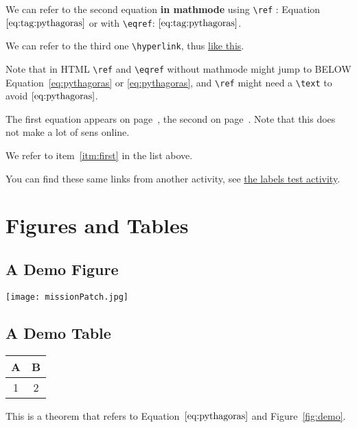 \documentclass{ximera}
\begin{document}
We can refer to the second equation \textbf{in mathmode} using \verb|\ref| : Equation~$\text{\ref{eq:tag:pythagoras}}$ or with \verb|\eqref|: $\eqref{eq:tag:pythagoras}$.

We can refer to the third one  \verb|\hyperlink|, thus \hyperlink{ht:pythagoras}{like this}.

Note that in HTML \verb|\ref| and \verb|\eqref| without mathmode might jump to BELOW Equation~\ref{eq:pythagoras} or \eqref{eq:pythagoras}, and
\verb|\ref| might need a \verb|\text| to avoid $\ref{eq:pythagoras}$.

The first equation appears on page~\pageref{eq:pythagoras}, the second on page~\pageref{eq:tag:pythagoras}. 
Note that this does not make a lot of sens online.

We refer to item~\ref{itm:first} in the list above.

You can find these same links from another activity, see \hyperlink{xim:labelsFromOtherActivity}{the labels test activity}.

\section{Figures and Tables}

\subsection{A Demo Figure}
\label{sec:fig}

\begin{image}[0.3\textwidth]
  \centering
  \texttt{[image: missionPatch.jpg]} %
\end{image}
  \label{fig:demo}

\subsection{A Demo Table}

{
  \centering
  \begin{tabular}{|c|c|}
    \hline
    A & B \\
    \hline
    1 & 2 \\
    \hline
  \end{tabular}
  \label{tab:example}
}

 \begin{theorem} \label{thm:1}
  
  This is a theorem that refers to Equation~$\eqref{eq:pythagoras}$ and Figure~\ref{fig:demo}.

  
 \end{theorem}
\end{document}
